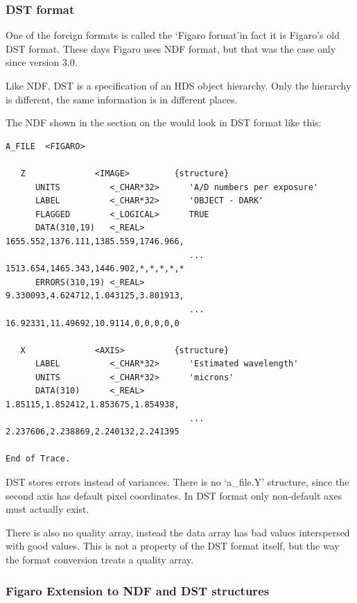 \subsubsection{\label{filesdst}DST format}

   One of the foreign formats is called the `Figaro format'\latorhtm{---}{-}in
   fact it is Figaro's old DST format. These days Figaro uses NDF format,
   but that was the case only since version 3.0.

   Like NDF, DST is a specification of an HDS object hierarchy. Only the
   hierarchy is different, the same information is in different places.

   The NDF shown in 
   {the section on the }
   would look in DST format like this:

\begin{verbatim}
A_FILE  <FIGARO>

   Z              <IMAGE>         {structure}
      UNITS          <_CHAR*32>      'A/D numbers per exposure'
      LABEL          <_CHAR*32>      'OBJECT - DARK'
      FLAGGED        <_LOGICAL>      TRUE
      DATA(310,19)   <_REAL>         1655.552,1376.111,1385.559,1746.966,
                                     ... 1513.654,1465.343,1446.902,*,*,*,*,*
      ERRORS(310,19) <_REAL>        9.330093,4.624712,1.043125,3.801913,
                                     ... 16.92331,11.49692,10.9114,0,0,0,0,0

   X              <AXIS>          {structure}
      LABEL          <_CHAR*32>      'Estimated wavelength'
      UNITS          <_CHAR*32>      'microns'
      DATA(310)      <_REAL>         1.85115,1.852412,1.853675,1.854938,
                                     ... 2.237606,2.238869,2.240132,2.241395

End of Trace.
\end{verbatim}

   DST stores errors instead of variances. There is no `a\_file.Y'
   structure, since the second axis has default pixel coordinates. In
   DST format only non-default axes must actually exist.

   There is also no quality array, instead the data array has bad values
   interspersed with good values. This is not a property of the DST
   format itself, but the way the format conversion treats a quality
   array.


\subsubsection{\label{filesextens}Figaro Extension to NDF and DST structures}

